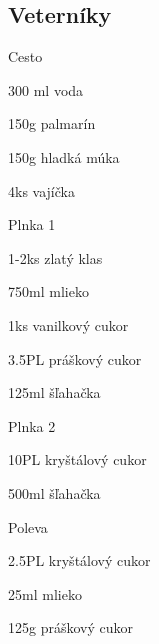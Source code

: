 \setcounter{step}{0}
\subsection{Veterníky}

\begin{ingredient}

\vspace{0.5cm}

\begin{subingredient}{Cesto}
	\item 300 ml voda
	\item 150g palmarín
	\item 150g hladká múka
	\item 4ks vajíčka
\end{subingredient}
\begin{subingredient}{Plnka 1}
	\item 1-2ks zlatý klas
	\item 750ml mlieko
	\item 1ks vanilkový cukor
	\item 3.5PL práškový cukor
	\item 125ml šľahačka
\end{subingredient}
\begin{subingredient}{Plnka 2}
	\item 10PL kryštálový cukor
	\item 500ml šľahačka
\end{subingredient}
\begin{subingredient}{Poleva}
	\item 2.5PL kryštálový cukor
	\item 25ml mlieko
	\item 125g práškový cukor
\end{subingredient}
\end{ingredient}%
